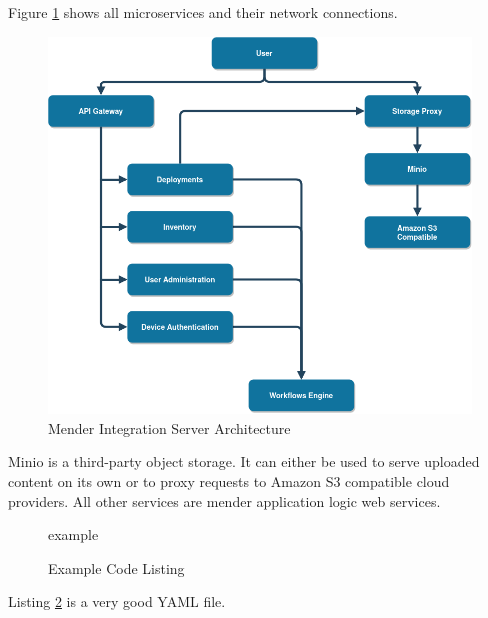 Figure \ref{fig:mender-integration} shows all microservices and their network connections.
\begin{figure}
    \centering
    \includegraphics[scale=0.5]{images/integration-app.png}
    \caption{Mender Integration Server Architecture}
    \label{fig:mender-integration}
\end{figure}
Minio is a third-party object storage. It can either be used to serve uploaded content on its own or to proxy requests to Amazon S3 compatible cloud providers. All other services are mender application logic web services.
\newpage

\begin{figure}
    {example}
    \caption{Example Code Listing}
    \label{code:example-label}
\end{figure}

Listing \ref{code:example-label} is a very good YAML file.
